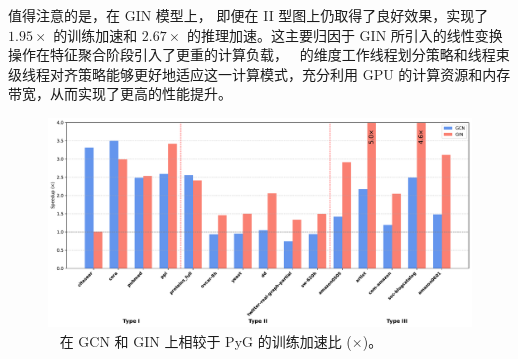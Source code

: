 值得注意的是，在 GIN 模型上，\Mname{} 即便在 II 型图上仍取得了良好效果，实现了 $1.95\times$ 的训练加速和 $2.67\times$ 的推理加速。这主要归因于 GIN 所引入的线性变换操作在特征聚合阶段引入了更重的计算负载，~\Mname{} 的维度工作线程划分策略和线程束级线程对齐策略能够更好地适应这一计算模式，充分利用 GPU 的计算资源和内存带宽，从而实现了更高的性能提升。
\begin{figure}[htbp] 
    \centering
    \includegraphics[width=0.9\linewidth]{images/pyg_train_cmp.pdf} 
    \caption{~\Mname{} 在 GCN 和 GIN 上相较于 PyG 的训练加速比 ($\times$)。}
    \label{fig: Speedup vs PyG Training}
    \setlength{\abovecaptionskip}{0.4cm} %
    \setlength{\belowcaptionskip}{-0.4cm} %
\end{figure}
